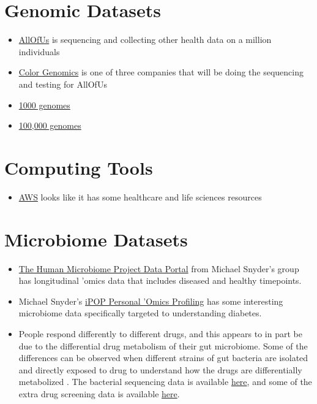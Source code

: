 \documentclass[]{book}
\providecommand{\tightlist}{%
  \setlength{\itemsep}{0pt}\setlength{\parskip}{0pt}}
\begin{document}
\section{Genomic Datasets}\label{genomic-datasets}

\begin{itemize}
\tightlist
\item
  \href{ttps://www.joinallofus.org/en/how-to-join}{AllOfUs} is
  sequencing and collecting other health data on a million individuals
\item
  \href{https://www.color.com/}{Color Genomics} is one of three
  companies that will be doing the sequencing and testing for AllOfUs
\item
  \href{http://www.internationalgenome.org/data/}{1000 genomes}
\item
  \href{https://www.genomicsengland.co.uk/}{100,000 genomes}
\end{itemize}

\section{Computing Tools}\label{computing-tools}

\begin{itemize}
\tightlist
\item
  \href{https://aws.amazon.com/health/}{AWS} looks like it has some
  healthcare and life sciences resources
\end{itemize}

\section{Microbiome Datasets}\label{microbiome-datasets}

\begin{itemize}
\tightlist
\item
  \href{https://portal.hmpdacc.org/}{The Human Microbiome Project Data
  Portal} from Michael Snyder's group has longitudinal 'omics data that
  includes diseased and healthy timepoints.
\item
  Michael Snyder's \href{http://med.stanford.edu/ipop.html}{iPOP
  Personal 'Omics Profiling} has some interesting microbiome data
  specifically targeted to understanding diabetes.
\item
  People respond differently to different drugs, and this appears to in
  part be due to the differential drug metabolism of their gut
  microbiome. Some of the differences can be observed when different
  strains of gut bacteria are isolated and directly exposed to drug to
  understand how the drugs are differentially metabolized
  \citep{zimmermann2019mapping}. The bacterial sequencing data is
  available
  \href{https://www.ebi.ac.uk/ena/data/search?query=PRJEB31790}{here},
  and some of the extra drug screening data is available
  \href{https://figshare.com/articles/Mapping_human_microbiome_drug_metabolism_by_gut_bacteria_and_their_genes/8119058}{here}.
\end{itemize}
\end{document}
